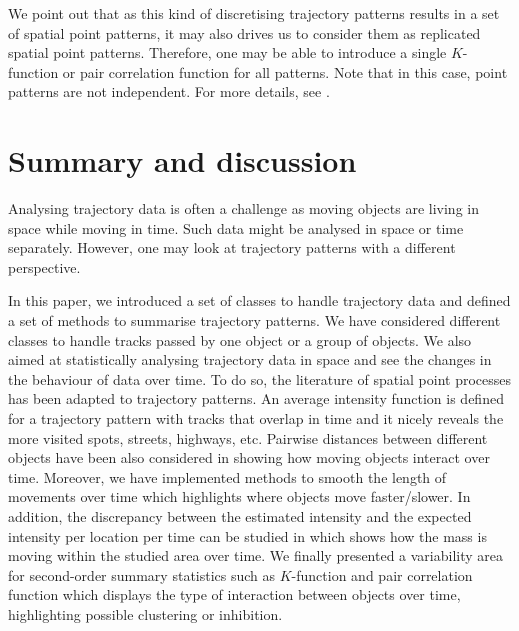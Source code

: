 \documentclass[article]{jss}
\begin{document}

  We point out that as this kind of discretising trajectory patterns results in a set of spatial point patterns, it may also drives us to consider them as replicated spatial point patterns. Therefore, one may be able to introduce a single $K$-function or pair correlation function for all patterns. Note that in this case, point patterns are not independent. For more details, see \citet[Section 5.4]{D13}.
  
 \section{Summary and discussion} \label{sec:summary}
  Analysing trajectory data is often a challenge as moving objects are living in space while moving in time. Such data might be analysed in space or time separately. However, one may look at trajectory patterns with a different perspective. 
  
  In this paper, we introduced a set of classes to handle trajectory data and defined a set of methods to summarise trajectory patterns. We have considered different classes to handle tracks passed by one object or a group of objects. We also aimed at statistically analysing trajectory data in space and see the changes in the behaviour of data over time. To do so, the literature of spatial point processes has been adapted to trajectory patterns. An average intensity function is defined for a trajectory pattern with tracks that overlap in time and it nicely reveals the more visited spots, streets, highways, etc. Pairwise distances between different objects have been also considered in  showing how moving objects interact over time. Moreover, we have implemented methods to smooth the length of movements over time which highlights where objects move faster/slower. In addition, the discrepancy between the estimated intensity and the expected intensity per location per time can be studied in  which shows how the mass is moving within the studied area over time. We finally presented a variability area for second-order summary statistics such as $K$-function and pair correlation function which displays the type of interaction between objects over time, highlighting possible clustering or inhibition.
  
\end{document}
